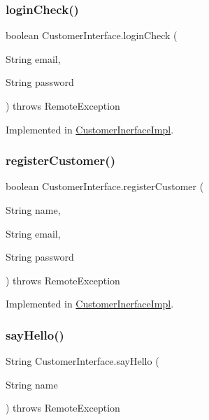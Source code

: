 \subsubsection{\texorpdfstring{loginCheck()}{loginCheck()}}
{\footnotesize\ttfamily boolean Customer\+Interface.\+login\+Check (\begin{DoxyParamCaption}\item[{String}]{email,  }\item[{String}]{password }\end{DoxyParamCaption}) throws Remote\+Exception}



Implemented in \mbox{\hyperlink{class_customer_inerface_impl_a508e5e0b67fd7dc5b0852af19d20bc31}{Customer\+Inerface\+Impl}}.

\mbox{\label{interface_customer_interface_ad0130eaa14a8f40060a9328aeedab244}} 
\subsubsection{\texorpdfstring{registerCustomer()}{registerCustomer()}}
{\footnotesize\ttfamily boolean Customer\+Interface.\+register\+Customer (\begin{DoxyParamCaption}\item[{String}]{name,  }\item[{String}]{email,  }\item[{String}]{password }\end{DoxyParamCaption}) throws Remote\+Exception}



Implemented in \mbox{\hyperlink{class_customer_inerface_impl_aa5029a5038b56d80f3858d8e259f2f20}{Customer\+Inerface\+Impl}}.

\mbox{\label{interface_customer_interface_a9ab16776cf93e41a43e58f890189e3d1}} 
\subsubsection{\texorpdfstring{sayHello()}{sayHello()}}
{\footnotesize\ttfamily String Customer\+Interface.\+say\+Hello (\begin{DoxyParamCaption}\item[{String}]{name }\end{DoxyParamCaption}) throws Remote\+Exception}



